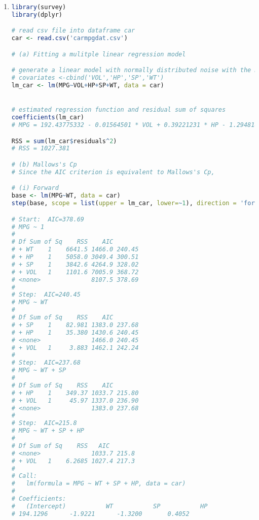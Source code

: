 \documentclass[a4paper,10pt]{article}
\theoremstyle{definition}
\begin{document}
\begin{enumerate}
\begin{enumerate}[(a)]
\begin{align*}
r(f,\theta) &= \sum_{\theta=1,2}R(\theta,\hat{\theta}_{p,q})\mathbb{P}(\theta)\\
&= \lambda R(1,\hat{\theta}_{p,q})+ (1-\lambda)R(2,\hat{\theta}_{p,q})
\end{align*}
where $R(1,\hat{\theta}_{p,q})$ and $R(2,\hat{\theta}_{p,q})$ are the values are from (a).
\item Given $\lambda = 1/2$, we have
\begin{align*}
r(f,\theta)=\frac{1}{2} \left(R(1,\hat{\theta}_{p,q})+ R(2,\hat{\theta}_{p,q})\right) &=\frac{1}{2}\left(16.3-13.6p_B-14.7q_B-24.8p_W-27.6q_W-5.6p_G-5.6q_G\right)
\end{align*}
thus to the infimum of Bayes risk is when $q_B = q_W = q_G =1$. This means the decision is to choose box 2 regardless of the color of the ball drawn.
\end{enumerate}

\newpage
\item


\begin{lstlisting}[language=R,commentstyle=\fontseries{lc}\color{gray}]
library(survey)
library(dplyr)

# read csv file into dataframe car
car <- read.csv('carmpgdat.csv')

# (a) Fitting a mulitple linear regression model

# generate a linear model with normally distributed noise with the model MPG~VOL+HP+SP+WT
# covariates <-cbind('VOL','HP','SP','WT')
lm_car <- lm(MPG~VOL+HP+SP+WT, data = car)


# estimated regression function and residual sum of squares
coefficients(lm_car)
# MPG = 192.43775332 - 0.01564501 * VOL + 0.39221231 * HP - 1.29481848 * SP - 1.85980373 * WT

RSS = sum(lm_car$residuals^2)
# RSS = 1027.381

# (b) Mallows's Cp
# Since the AIC criterion is equivalent to Mallows's Cp, 

# (i) Forward
base <- lm(MPG~WT, data = car)
step(base, scope = list(upper = lm_car, lower=~1), direction = 'forward', trace = TRUE)

# Start:  AIC=378.69
# MPG ~ 1
# 
# Df Sum of Sq    RSS    AIC
# + WT    1    6641.5 1466.0 240.45
# + HP    1    5058.0 3049.4 300.51
# + SP    1    3842.6 4264.9 328.02
# + VOL   1    1101.6 7005.9 368.72
# <none>              8107.5 378.69
# 
# Step:  AIC=240.45
# MPG ~ WT
# 
# Df Sum of Sq    RSS    AIC
# + SP    1    82.981 1383.0 237.68
# + HP    1    35.380 1430.6 240.45
# <none>              1466.0 240.45
# + VOL   1     3.883 1462.1 242.24
# 
# Step:  AIC=237.68
# MPG ~ WT + SP
# 
# Df Sum of Sq    RSS    AIC
# + HP    1    349.37 1033.7 215.80
# + VOL   1     45.97 1337.0 236.90
# <none>              1383.0 237.68
# 
# Step:  AIC=215.8
# MPG ~ WT + SP + HP
# 
# Df Sum of Sq    RSS   AIC
# <none>              1033.7 215.8
# + VOL   1    6.2685 1027.4 217.3
# 
# Call:
#   lm(formula = MPG ~ WT + SP + HP, data = car)
# 
# Coefficients:
#   (Intercept)           WT           SP           HP  
# 194.1296      -1.9221      -1.3200       0.4052 


\end{lstlisting}
\end{enumerate}
\end{document}
